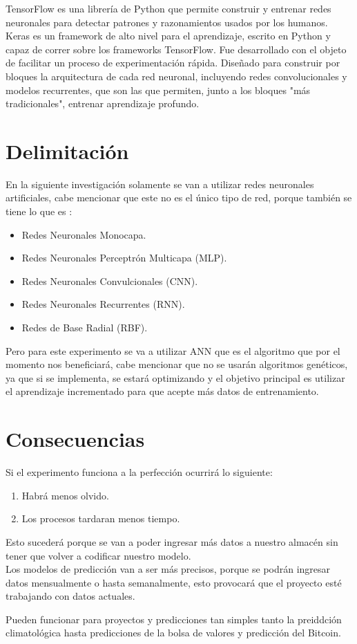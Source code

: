         TensorFlow es una librería de Python que permite construir y entrenar redes neuronales para detectar patrones y
        razonamientos usados por los humanos. \\

        Keras es un framework de alto nivel para el aprendizaje, escrito en Python y capaz de correr sobre los 
        frameworks TensorFlow. Fue desarrollado con el objeto de facilitar un proceso de experimentación rápida. Diseñado para construir por bloques la arquitectura de cada red neuronal, incluyendo redes convolucionales y modelos recurrentes, que son las que permiten, junto a los bloques "más tradicionales", entrenar aprendizaje profundo.


\section{Delimitación}
            
    En la siguiente investigación solamente se van a utilizar redes neuronales artificiales, cabe mencionar que este no es el único tipo de red, porque también se tiene lo que es \cite{royo2021}:
    \begin{itemize}
        \item Redes Neuronales Monocapa.
        \item Redes Neuronales Perceptrón Multicapa (MLP).
        \item Redes Neuronales Convulcionales (CNN).
        \item Redes Neuronales Recurrentes (RNN).
        \item Redes de Base Radial (RBF).
    \end{itemize}
    Pero para este experimento se va a utilizar ANN que es el algoritmo que por el momento nos beneficiar\'a, cabe mencionar que no se usar\'an algoritmos genéticos, ya que si se implementa, se estará
    optimizando y el objetivo principal es utilizar el aprendizaje incrementado para que acepte más datos de entrenamiento.

\section{Consecuencias}

    Si el experimento funciona a la perfecci\'on ocurrir\'a lo siguiente:
    \begin{enumerate}
        \item Habrá menos olvido.
        \item Los procesos tardaran menos tiempo.
    \end{enumerate}

    Esto sucederá porque se van a poder ingresar m\'as datos a nuestro almacén sin 
    tener que volver a codificar nuestro modelo.\\
    Los modelos de predicci\'on van a ser m\'as precisos, porque se podrán ingresar 
    datos mensualmente o hasta semanalmente, esto provocar\'a que el proyecto est\'e trabajando 
    con datos actuales.

    Pueden funcionar para proyectos y predicciones tan simples tanto la preiddci\'on climatol\'ogica
    hasta predicciones de la bolsa de valores y predicci\'on del Bitcoin.


